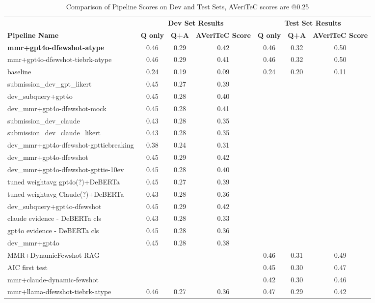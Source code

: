 \begin{table*}[h]
    \centering
    \begin{tabular}{l | c c c | c c c}
    \hline
    &\multicolumn{3}{c|}{\textbf{Dev Set Results}} & \multicolumn{3}{c}{\textbf{Test Set Results}}  \\
    \textbf{Pipeline Name} & \textbf{Q only} & \textbf{Q+A} & \textbf{AVeriTeC Score} & \textbf{Q only} & \textbf{Q+A} & \textbf{AVeriTeC Score} \\ \hline
    \textbf{mmr+gpt4o-dfewshot-atype}      & 0.46 & 0.29 & 0.42 & 0.46 & 0.32 & 0.50\\
    mmr+gpt4o-dfewshot-tiebrk-atype & 0.46 & 0.29 & 0.41 & 0.46 & 0.32 & 0.50\\
    \averitec{} baseline            & 0.24 & 0.19 & 0.09 & 0.24 & 0.20 & 0.11\\
    \hline
    submission\_dev\_gpt\_likert       & 0.45 & 0.27 & 0.39 \\
    dev\_subquery+gpt4o                & 0.45 & 0.28 & 0.40 \\
    
    dev\_mmr+gpt4o-dfewshot-mock       & 0.45 & 0.28 & 0.41 \\
    submission\_dev\_claude            & 0.43 & 0.28 & 0.35 \\
    submission\_dev\_claude\_likert   & 0.43 & 0.28 & 0.35 \\
    dev\_mmr+gpt4o-dfewshot-gpttiebreaking & 0.38 & 0.24 & 0.31 \\
    dev\_mmr+gpt4o-dfewshot            & 0.45 & 0.29 & 0.42 \\
    dev\_mmr+gpt4o-dfewshot-gpttie-10ev & 0.45 & 0.28 & 0.40 \\
    tuned weightavg gpt4o(?)+DeBERTa          & 0.45 & 0.27 & 0.39 \\
    tuned weightavg Claude(?)+DeBERTa          & 0.43 & 0.28 & 0.36 \\
    dev\_subquery+gpt4o-dfewshot       & 0.45 & 0.29 & 0.42 \\
    claude evidence - DeBERTa cls               & 0.43 & 0.28 & 0.33 \\
    gpt4o evidence - DeBERTa cls               & 0.45 & 0.28 & 0.36 \\
    dev\_mmr+gpt4o                     & 0.45 & 0.28 & 0.38 \\
    MMR+DynamicFewshot RAG            & & & & 0.46 & 0.31 & 0.49 \\
    AIC first test                     & & & & 0.45 & 0.30 & 0.47 \\
    mmr+claude-dynamic-fewshot          & & & & 0.42 & 0.30 & 0.46 \\
    
    \hline
    mmr+llama-dfewshot-tiebrk-atype & 0.46 & 0.27 & 0.36 & 0.47 & 0.29 & 0.42\\
    \bottomrule
    \end{tabular}
    \caption{Comparison of Pipeline Scores on Dev and Test Sets, AVeriTeC scores are @0.25}
    \label{tab:pipeline_scores}
\end{table*}
    